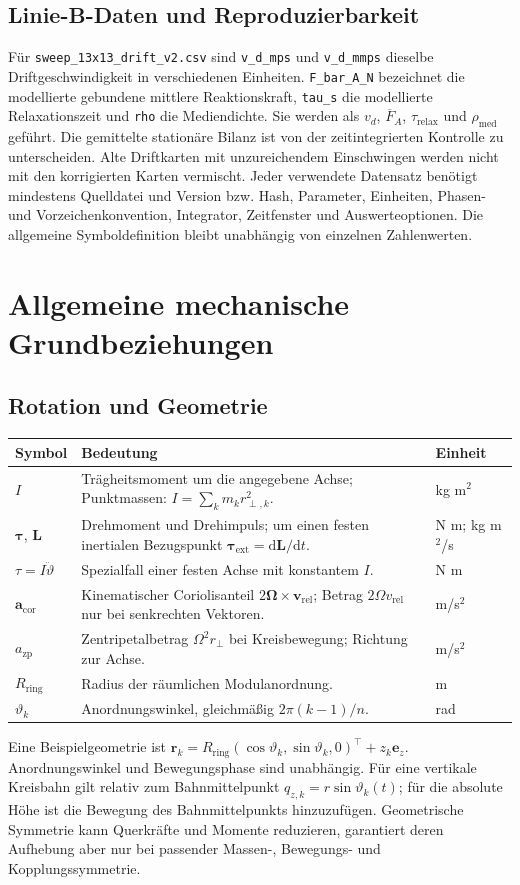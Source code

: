 \documentclass[11pt,a4paper]{article}
\makeatletter
\newcommand{\dd}{\mathrm{d}}
\newenvironment{symtab}{\begin{longtable}{@{}L{.22\textwidth}L{.62\textwidth}L{.12\textwidth}@{}}\toprule\textbf{Symbol}&\textbf{Bedeutung}&\textbf{Einheit}\\\midrule\endhead}{\bottomrule\end{longtable}}
\makeatother
\begin{document}
\subsection{Linie-B-Daten und Reproduzierbarkeit}\label{app:linieb}
Für \texttt{sweep\_13x13\_drift\_v2.csv} sind \texttt{v\_d\_mps} und \texttt{v\_d\_mmps} dieselbe Driftgeschwindigkeit in verschiedenen Einheiten. \texttt{F\_bar\_A\_N} bezeichnet die modellierte gebundene mittlere Reaktionskraft, \texttt{tau\_s} die modellierte Relaxationszeit und \texttt{rho} die Mediendichte. Sie werden als $v_d$, $\overline F_A$, $\tau_{\mathrm{relax}}$ und $\rho_{\mathrm{med}}$ geführt. Die gemittelte stationäre Bilanz ist von der zeitintegrierten Kontrolle zu unterscheiden. Alte Driftkarten mit unzureichendem Einschwingen werden nicht mit den korrigierten Karten vermischt.
Jeder verwendete Datensatz benötigt mindestens Quelldatei und Version bzw. Hash, Parameter, Einheiten, Phasen- und Vorzeichenkonvention, Integrator, Zeitfenster und Auswerteoptionen. Die allgemeine Symboldefinition bleibt unabhängig von einzelnen Zahlenwerten.

\section{Allgemeine mechanische Grundbeziehungen}
\subsection{Rotation und Geometrie}
\begin{symtab}
$I$&Trägheitsmoment um die angegebene Achse; Punktmassen: $I=\sum_k m_kr_{\perp,k}^2$.&kg m$^2$\\
$\boldsymbol\tau$, $\mathbf L$&Drehmoment und Drehimpuls; um einen festen inertialen Bezugspunkt $\boldsymbol\tau_{\mathrm{ext}}=\dd\mathbf L/\dd t$.&N m; kg m$^2$/s\\
$\tau=I\ddot\vartheta$&Spezialfall einer festen Achse mit konstantem $I$.&N m\\
$\mathbf a_{\mathrm{cor}}$&Kinematischer Coriolisanteil $2\boldsymbol\Omega\times\mathbf v_{\mathrm{rel}}$; Betrag $2\Omega v_{\mathrm{rel}}$ nur bei senkrechten Vektoren.&m/s$^2$\\
$a_{\mathrm{zp}}$&Zentripetalbetrag $\Omega^2r_\perp$ bei Kreisbewegung; Richtung zur Achse.&m/s$^2$\\
$R_{\mathrm{ring}}$&Radius der räumlichen Modulanordnung.&m\\
$\vartheta_k$&Anordnungswinkel, gleichmäßig $2\pi(k-1)/n$.&rad\\
\end{symtab}
Eine Beispielgeometrie ist $\mathbf r_k=R_{\mathrm{ring}}(\cos\vartheta_k,\sin\vartheta_k,0)^\top+z_k\mathbf e_z$. Anordnungswinkel und Bewegungsphase sind unabhängig. Für eine vertikale Kreisbahn gilt relativ zum Bahnmittelpunkt $q_{z,k}=r\sin\vartheta_k(t)$; für die absolute Höhe ist die Bewegung des Bahnmittelpunkts hinzuzufügen.
Geometrische Symmetrie kann Querkräfte und Momente reduzieren, garantiert deren Aufhebung aber nur bei passender Massen-, Bewegungs- und Kopplungssymmetrie.
\end{document}
